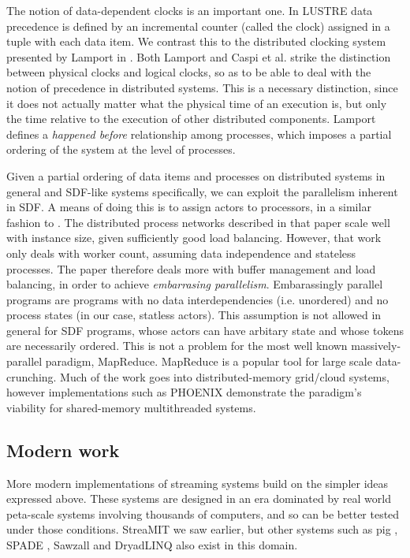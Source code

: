 The notion of data-dependent clocks is an important one.
In LUSTRE data precedence is defined by an incremental counter (called the clock) assigned in a tuple with each data item.
We contrast this to the distributed clocking system presented by Lamport in \cite{lam78}.
Both Lamport and Caspi et al. strike the distinction between physical clocks and logical clocks, so as to be able to deal with the notion of precedence in distributed systems.
This is a necessary distinction, since it does not actually matter what the physical time of an execution is, but only the time relative to the execution of other distributed components.
Lamport defines a {\em happened before} relationship among processes, which imposes a partial ordering of the system at the level of processes.

Given a partial ordering of data items and processes on distributed systems in general and SDF-like systems specifically, we can exploit the parallelism inherent in SDF.
A means of doing this is to assign actors to processors, in a similar fashion to \cite{par03}.
The distributed process networks described in that paper scale well with instance size, given sufficiently good load balancing.
However, that work only deals with worker count, assuming data independence and stateless processes.
The paper therefore deals more with buffer management and load balancing, in order to achieve {\em embarrasing parallelism}.
Embarassingly parallel programs are programs with no data interdependencies (i.e. unordered) and no process states (in our case, statless actors).
This assumption is not allowed in general for SDF programs, whose actors can have arbitary state and whose tokens are necessarily ordered.
This is not a problem for the most well known massively-parallel paradigm, MapReduce.
MapReduce \cite{dea08} is a popular tool for large scale data-crunching.
Much of the work goes into distributed-memory grid/cloud systems, however implementations such as PHOENIX \cite{ran07} demonstrate the paradigm's viability for shared-memory multithreaded systems.

\subsection{Modern work}

More modern implementations of streaming systems build on the simpler ideas expressed above.
These systems are designed in an era dominated by real world peta-scale systems involving thousands of computers, and so can be better tested under those conditions.
StreaMIT \cite{thies01, thies02, thies10} we saw earlier, but other systems such as pig \cite{ols08}, SPADE \cite{ged08}, Sawzall \cite{pik05} and DryadLINQ \cite{yu08} also exist in this domain.

